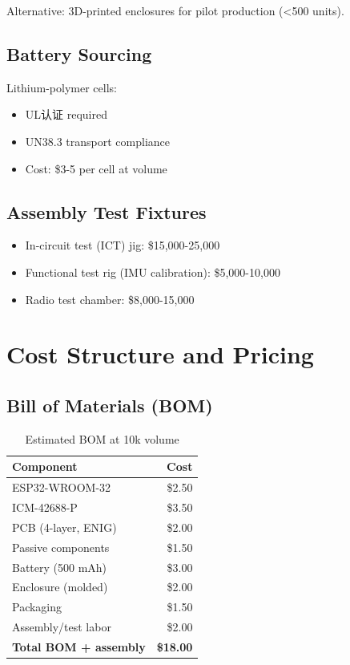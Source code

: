 Alternative: 3D-printed enclosures for pilot production (<500 units).

\subsection{Battery Sourcing}

Lithium-polymer cells:
\begin{itemize}
    \item UL认证 required
    \item UN38.3 transport compliance
    \item Cost: \$3-5 per cell at volume
\end{itemize}

\subsection{Assembly Test Fixtures}

\begin{itemize}
    \item In-circuit test (ICT) jig: \$15,000-25,000
    \item Functional test rig (IMU calibration): \$5,000-10,000
    \item Radio test chamber: \$8,000-15,000
\end{itemize}

\section{Cost Structure and Pricing}

\subsection{Bill of Materials (BOM)}

\begin{table}[h]
    \centering
    \caption{Estimated BOM at 10k volume}
    \label{tab:bom_cost}
    \begin{tabular}{lr}
        \toprule
        \textbf{Component} & \textbf{Cost} \\
        \midrule
        ESP32-WROOM-32 & \$2.50 \\
        ICM-42688-P & \$3.50 \\
        PCB (4-layer, ENIG) & \$2.00 \\
        Passive components & \$1.50 \\
        Battery (500 mAh) & \$3.00 \\
        Enclosure (molded) & \$2.00 \\
        Packaging & \$1.50 \\
        Assembly/test labor & \$2.00 \\
        \midrule
        \textbf{Total BOM + assembly} & \textbf{\$18.00} \\
        \bottomrule
    \end{tabular}
\end{table}

